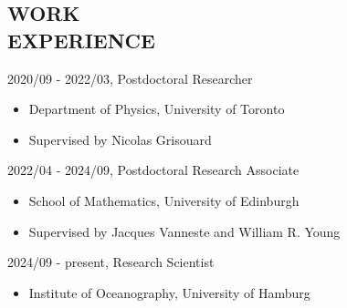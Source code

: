 \documentclass[margin]{res}
\begin{document}
\begin{resume}
\section{{\normalfont WORK \\EXPERIENCE}}
2020/09 - 2022/03, Postdoctoral Researcher
\begin{itemize}[leftmargin=*,noitemsep]
\item[]{Department of Physics, University of Toronto}
\item[]{Supervised by Nicolas Grisouard}
\end{itemize}
2022/04 - 2024/09, Postdoctoral Research Associate
\begin{itemize}[leftmargin=*,noitemsep]
\item[]{School of Mathematics, University of Edinburgh}
\item[]{Supervised by  Jacques Vanneste and William R. Young }
\end{itemize}
2024/09 - present, Research Scientist
\begin{itemize}[leftmargin=*,noitemsep]
\item[]{Institute of Oceanography, University of Hamburg}
\end{itemize}



\end{resume}
\end{document}
